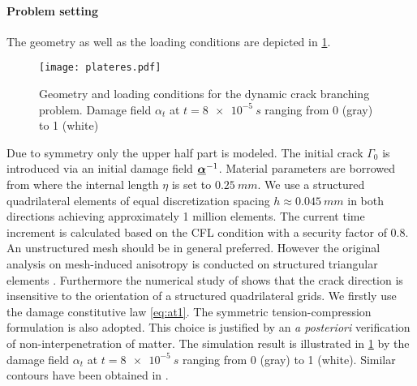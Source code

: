 \paragraph{Problem setting} The geometry as well as the loading conditions are depicted in \cref{fig:branching}.
\begin{figure}[htbp]
\centering
\texttt{[image: plateres.pdf]}
\caption{Geometry and loading conditions for the dynamic crack branching problem. Damage field $\alpha_t$ at $t=\SI{8e-5}{s}$ ranging from 0 (gray) to 1 (white)} \label{fig:branching}
\end{figure}
Due to symmetry only the upper half part is modeled. The initial crack $\Gamma_0$ is introduced via an initial damage field $\dvec^{-1}$. Material parameters are borrowed from \cite{BordenVerhooselScottHughesLandis:2012} where the internal length $\eta$ is set to $\SI{0.25}{mm}$. We use a structured quadrilateral elements of equal discretization spacing $h\approx\SI{0.045}{mm}$ in both directions achieving approximately 1 million elements. The current time increment is calculated based on the CFL condition with a security factor of 0.8. An unstructured mesh should be in general preferred. However the original analysis on mesh-induced anisotropy is conducted on structured triangular elements \cite{Negri:1999}. Furthermore the numerical study of \cite{LorentzGodard:2011} shows that the crack direction is insensitive to the orientation of a structured quadrilateral grids. We firstly use the damage constitutive law \eqref{eq:at1}. The symmetric tension-compression formulation is also adopted. This choice is justified by an \emph{a posteriori} verification of non-interpenetration of matter. The simulation result is illustrated in \cref{fig:branching} by the damage field $\alpha_t$ at $t=\SI{8e-5}{s}$ ranging from 0 (gray) to 1 (white). Similar contours have been obtained in \cite{BordenVerhooselScottHughesLandis:2012,SchlueterWillenbuecherKuhnMueller:2014}.

